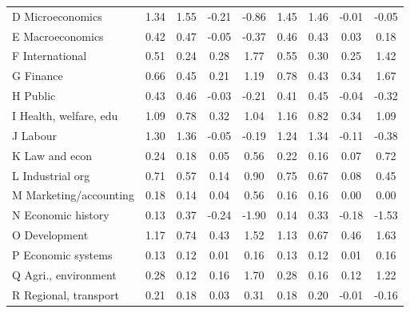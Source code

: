 \begin{table}[H]
\begin{adjustwidth}{-0.6cm}{}
\begin{threeparttable}
\begin{tabular}{p{3.55cm}S@{}S@{}S@{}S@{}S@{}S@{}S@{}S@{}}
            \quad D Microeconomics&        1.34&        1.55&       -0.21&       -0.86&        1.45&        1.46&       -0.01&       -0.05\\
            \quad E Macroeconomics&        0.42&        0.47&       -0.05&       -0.37&        0.46&        0.43&        0.03&        0.18\\
            \quad F International&        0.51&        0.24&        0.28&        1.77&        0.55&        0.30&        0.25&        1.42\\
            \quad G Finance     &        0.66&        0.45&        0.21&        1.19&        0.78&        0.43&        0.34&        1.67\\
            \quad H Public      &        0.43&        0.46&       -0.03&       -0.21&        0.41&        0.45&       -0.04&       -0.32\\
            \quad I Health, welfare, edu&        1.09&        0.78&        0.32&        1.04&        1.16&        0.82&        0.34&        1.09\\
            \quad J Labour      &        1.30&        1.36&       -0.05&       -0.19&        1.24&        1.34&       -0.11&       -0.38\\
            \quad K Law and econ&        0.24&        0.18&        0.05&        0.56&        0.22&        0.16&        0.07&        0.72\\
            \quad L Industrial org&        0.71&        0.57&        0.14&        0.90&        0.75&        0.67&        0.08&        0.45\\
            \quad M Marketing/accounting&        0.18&        0.14&        0.04&        0.56&        0.16&        0.16&        0.00&        0.00\\
            \quad N Economic history&        0.13&        0.37&       -0.24&       -1.90&        0.14&        0.33&       -0.18&       -1.53\\
            \quad O Development &        1.17&        0.74&        0.43&        1.52&        1.13&        0.67&        0.46&        1.63\\
            \quad P Economic systems&        0.13&        0.12&        0.01&        0.16&        0.13&        0.12&        0.01&        0.16\\
            \quad Q Agri., environment&        0.28&        0.12&        0.16&        1.70&        0.28&        0.16&        0.12&        1.22\\
            \quad R Regional, transport&        0.21&        0.18&        0.03&        0.31&        0.18&        0.20&       -0.01&       -0.16\\

\end{tabular}
\end{threeparttable}
\end{adjustwidth}
\end{table}
